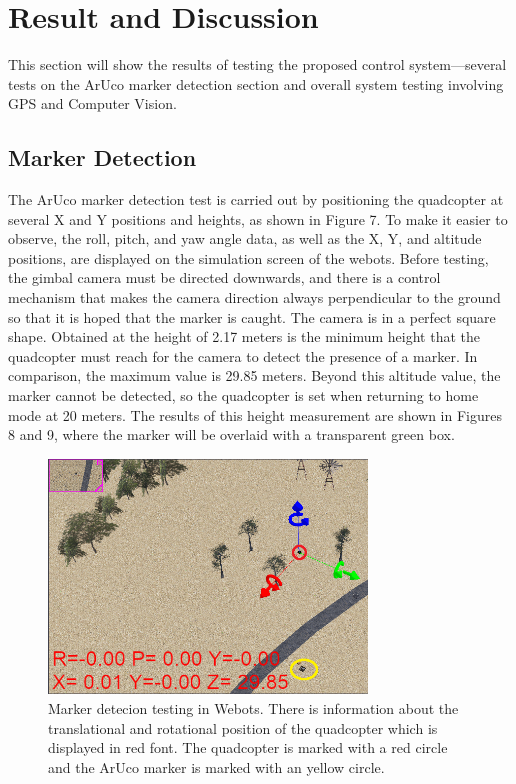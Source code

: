 \documentclass[a4paper]{jpconf}
\begin{document}
\section{Result and Discussion}
This section will show the results of testing the proposed control system—several tests on the ArUco marker detection section and overall system testing involving GPS and Computer Vision.

\subsection{Marker Detection}
The ArUco marker detection test is carried out by positioning the quadcopter at several X and Y positions and heights, as shown in Figure 7. To make it easier to observe, the roll, pitch, and yaw angle data, as well as the X, Y, and altitude positions, are displayed on the simulation screen of the webots. Before testing, the gimbal camera must be directed downwards, and there is a control mechanism that makes the camera direction always perpendicular to the ground so that it is hoped that the marker is caught. The camera is in a perfect square shape. Obtained at the height of 2.17 meters is the minimum height that the quadcopter must reach for the camera to detect the presence of a marker. In comparison, the maximum value is 29.85 meters. Beyond this altitude value, the marker cannot be detected, so the quadcopter is set when returning to home mode at 20 meters. The results of this height measurement are shown in Figures 8 and 9, where the marker will be overlaid with a transparent green box.

\begin{figure}[h]
    \centering
    \includegraphics[width=20pc]{marker-detection-testing-edit.png}
    \caption{\label{label}Marker detecion testing in Webots. There is information about the translational and rotational position of the quadcopter which is displayed in red font. The quadcopter is marked with a red circle and the ArUco marker is marked with an yellow circle.}
\end{figure}
\end{document}
